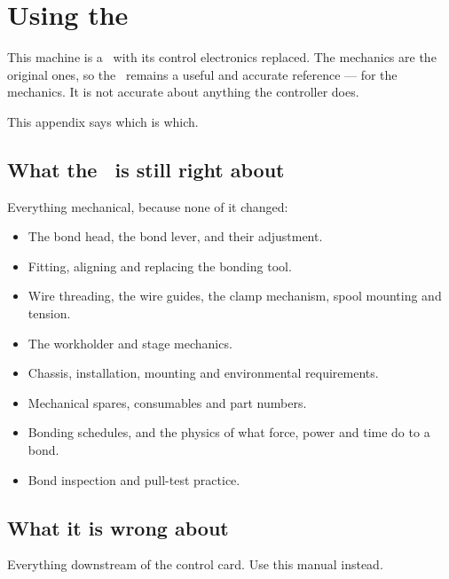 \chapter[Using the K\&S Service Manual]{Using the \ksmanual}
\label{app:ks}

This machine is a \basemachine\ with its control electronics replaced. The
mechanics are the original ones, so the \ksmanual\ remains a useful and
accurate reference --- for the mechanics. It is not accurate about anything the
controller does.

This appendix says which is which.

\section{What the \ksmanual\ is still right about}

Everything mechanical, because none of it changed:

\begin{itemize}[leftmargin=*]
\item The bond head, the bond lever, and their adjustment.
\item Fitting, aligning and replacing the bonding tool.
\item Wire threading, the wire guides, the clamp mechanism, spool mounting and
  tension.
\item The workholder and stage mechanics.
\item Chassis, installation, mounting and environmental requirements.
\item Mechanical spares, consumables and part numbers.
\item Bonding schedules, and the physics of what force, power and time do to a
  bond.
\item Bond inspection and pull-test practice.
\end{itemize}

\section{What it is wrong about}

Everything downstream of the control card. Use this manual instead.

